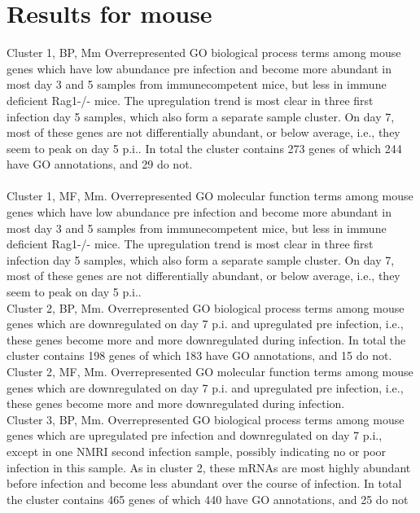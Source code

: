 \documentclass{article}
\begin{document}
\section{Results for mouse}
  Cluster 1, BP, Mm
  Overrepresented GO biological process terms among mouse genes which have low abundance pre infection and 
  become more abundant in most day 3 and 5 samples from immunecompetent mice, but less in immune deficient Rag1-/- mice. 
  The upregulation trend is most clear in three first infection day 5 samples, which also form a separate
  sample cluster. On day 7, most of these genes are not differentially abundant, or below average, i.e., they
  seem to peak on day 5 p.i.. In total the cluster contains 273 genes of which 244 have GO annotations, and 29 
  do not.\\
   \\
  

  Cluster 1, MF, Mm.
  Overrepresented GO molecular function terms among mouse genes which have low abundance pre infection and 
  become more abundant in most day 3 and 5 samples from immunecompetent mice, but less in immune deficient Rag1-/- mice. 
  The upregulation trend is most clear in three first infection day 5 samples, which also form a separate
  sample cluster. On day 7, most of these genes are not differentially abundant, or below average, i.e., they
  seem to peak on day 5 p.i..\\
  
  
  Cluster 2, BP, Mm.
  Overrepresented GO biological process terms among mouse genes which are downregulated on day 7 p.i. and
  upregulated pre infection, i.e., these genes become more and more downregulated during infection.
  In total the cluster contains 198 genes of which 183 have GO annotations, and 15 do not. \\
  

  Cluster 2, MF, Mm.
  Overrepresented GO molecular function terms among mouse genes which are downregulated on day 7 p.i. and
  upregulated pre infection, i.e., these genes become more and more downregulated during infection.\\
  
 
  Cluster 3, BP, Mm.
  Overrepresented GO biological process terms among mouse genes which are upregulated pre infection and
  downregulated on day 7 p.i., except in one NMRI second infection sample, possibly indicating no or
  poor infection in this sample. As in cluster 2, these mRNAs are most highly abundant before infection and
  become less abundant over the course of infection. In total the cluster contains 465 genes of which 440
  have GO annotations, and 25 do not\\
  
  
\end{document}
